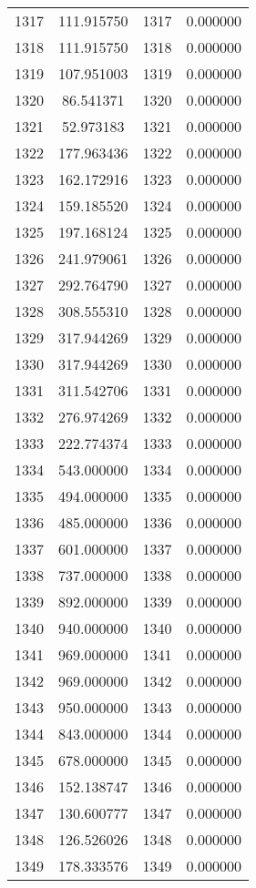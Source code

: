 \documentclass[12pt]{article}
\begin{document}
\begin{longtable}{@{}cccc@{}}
1317 & 111.915750 & 1317 & 0.000000 \\
1318 & 111.915750 & 1318 & 0.000000 \\
1319 & 107.951003 & 1319 & 0.000000 \\
1320 & 86.541371 & 1320 & 0.000000 \\
1321 & 52.973183 & 1321 & 0.000000 \\
1322 & 177.963436 & 1322 & 0.000000 \\
1323 & 162.172916 & 1323 & 0.000000 \\
1324 & 159.185520 & 1324 & 0.000000 \\
1325 & 197.168124 & 1325 & 0.000000 \\
1326 & 241.979061 & 1326 & 0.000000 \\
1327 & 292.764790 & 1327 & 0.000000 \\
1328 & 308.555310 & 1328 & 0.000000 \\
1329 & 317.944269 & 1329 & 0.000000 \\
1330 & 317.944269 & 1330 & 0.000000 \\
1331 & 311.542706 & 1331 & 0.000000 \\
1332 & 276.974269 & 1332 & 0.000000 \\
1333 & 222.774374 & 1333 & 0.000000 \\
1334 & 543.000000 & 1334 & 0.000000 \\
1335 & 494.000000 & 1335 & 0.000000 \\
1336 & 485.000000 & 1336 & 0.000000 \\
1337 & 601.000000 & 1337 & 0.000000 \\
1338 & 737.000000 & 1338 & 0.000000 \\
1339 & 892.000000 & 1339 & 0.000000 \\
1340 & 940.000000 & 1340 & 0.000000 \\
1341 & 969.000000 & 1341 & 0.000000 \\
1342 & 969.000000 & 1342 & 0.000000 \\
1343 & 950.000000 & 1343 & 0.000000 \\
1344 & 843.000000 & 1344 & 0.000000 \\
1345 & 678.000000 & 1345 & 0.000000 \\
1346 & 152.138747 & 1346 & 0.000000 \\
1347 & 130.600777 & 1347 & 0.000000 \\
1348 & 126.526026 & 1348 & 0.000000 \\
1349 & 178.333576 & 1349 & 0.000000 \\

\end{longtable}
\end{document}
